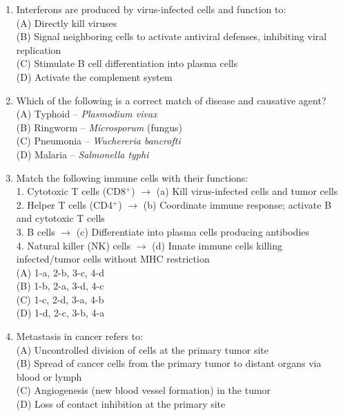 \documentclass{article}
\begin{document}
\begin{enumerate}[label=Q\arabic*.]
\item Interferons are produced by virus-infected cells and function to:
\\(A) Directly kill viruses
\\(B) Signal neighboring cells to activate antiviral defenses, inhibiting viral replication
\\(C) Stimulate B cell differentiation into plasma cells
\\(D) Activate the complement system

\item Which of the following is a correct match of disease and causative agent?
\\(A) Typhoid -- \textit{Plasmodium vivax}
\\(B) Ringworm -- \textit{Microsporum} (fungus)
\\(C) Pneumonia -- \textit{Wuchereria bancrofti}
\\(D) Malaria -- \textit{Salmonella typhi}

\item Match the following immune cells with their functions:\\
1. Cytotoxic T cells (CD8$^+$) $\rightarrow$ (a) Kill virus-infected cells and tumor cells\\
2. Helper T cells (CD4$^+$) $\rightarrow$ (b) Coordinate immune response; activate B and cytotoxic T cells\\
3. B cells $\rightarrow$ (c) Differentiate into plasma cells producing antibodies\\
4. Natural killer (NK) cells $\rightarrow$ (d) Innate immune cells killing infected/tumor cells without MHC restriction
\\(A) 1-a, 2-b, 3-c, 4-d
\\(B) 1-b, 2-a, 3-d, 4-c
\\(C) 1-c, 2-d, 3-a, 4-b
\\(D) 1-d, 2-c, 3-b, 4-a

\item Metastasis in cancer refers to:
\\(A) Uncontrolled division of cells at the primary tumor site
\\(B) Spread of cancer cells from the primary tumor to distant organs via blood or lymph
\\(C) Angiogenesis (new blood vessel formation) in the tumor
\\(D) Loss of contact inhibition at the primary site

\end{enumerate}
\end{document}

